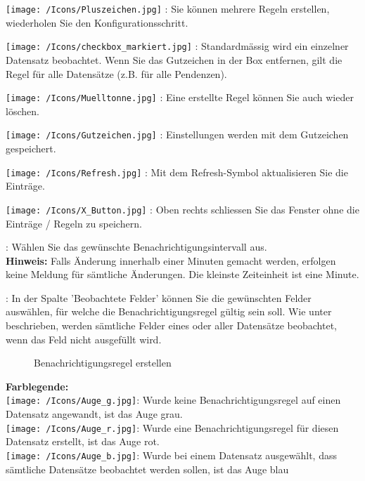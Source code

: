 \begin{compactitem}
	\item \texttt{[image: /Icons/Pluszeichen.jpg]} : Sie können mehrere Regeln erstellen, wiederholen Sie den Konfigurationsschritt.
	\item \texttt{[image: /Icons/checkbox\_markiert.jpg]} : Standardmässig wird ein einzelner Datensatz beobachtet. Wenn Sie das Gutzeichen in der Box entfernen, gilt die Regel für alle Datensätze (z.B. für alle Pendenzen).
	\item \texttt{[image: /Icons/Muelltonne.jpg]} : Eine erstellte Regel können Sie auch wieder löschen.
	\item \texttt{[image: /Icons/Gutzeichen.jpg]} : Einstellungen werden mit dem Gutzeichen gespeichert.
	\item \texttt{[image: /Icons/Refresh.jpg]} : Mit dem Refresh-Symbol aktualisieren Sie die Einträge.
	\item \texttt{[image: /Icons/X\_Button.jpg]} : Oben rechts schliessen Sie das Fenster ohne die Einträge / Regeln zu speichern.
	\item {}: Wählen Sie das gewünschte Benachrichtigungsintervall aus.\\
	\textbf{Hinweis:} Falls Änderung innerhalb einer Minuten gemacht werden, erfolgen keine Meldung für sämtliche Änderungen. Die kleinste Zeiteinheit ist eine Minute.
	\item {}: In der Spalte 'Beobachtete Felder' können Sie die gewünschten Felder auswählen, für welche die Benachrichtigungsregel gültig sein soll. Wie unter  beschrieben, werden sämtliche Felder eines oder aller Datensätze beobachtet, wenn das Feld nicht ausgefüllt wird.
\end{compactitem}

\begin{figure}[H]
\caption{Benachrichtigungsregel erstellen}
\end{figure}

\textbf{Farblegende:}\\
\texttt{[image: /Icons/Auge\_g.jpg]}: Wurde keine Benachrichtigungsregel auf einen Datensatz angewandt, ist das Auge grau.\\
\texttt{[image: /Icons/Auge\_r.jpg]}: Wurde eine Benachrichtigungsregel für diesen Datensatz erstellt, ist das Auge rot.\\
\texttt{[image: /Icons/Auge\_b.jpg]}: Wurde bei einem Datensatz ausgewählt, dass sämtliche Datensätze beobachtet werden sollen, ist das Auge blau\\

